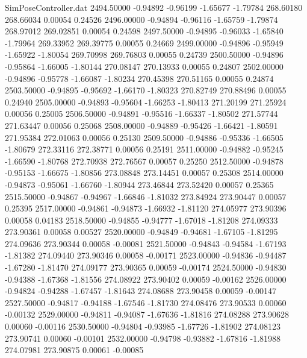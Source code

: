 \begin{filecontents}{SimPoseController.dat}
2494.50000   -0.94892   -0.96199    -1.65677   -1.79784  268.60180  268.66034    0.00054    0.24526
2496.00000   -0.94894   -0.96116    -1.65759   -1.79874  268.97012  269.02851    0.00054    0.24598
2497.50000   -0.94895   -0.96033    -1.65840   -1.79964  269.33952  269.39775    0.00055    0.24669
2499.00000   -0.94896   -0.95949    -1.65922   -1.80054  269.70998  269.76803    0.00055    0.24739
2500.50000   -0.94896   -0.95864    -1.66005   -1.80144  270.08147  270.13933    0.00055    0.24807
2502.00000   -0.94896   -0.95778    -1.66087   -1.80234  270.45398  270.51165    0.00055    0.24874
2503.50000   -0.94895   -0.95692    -1.66170   -1.80323  270.82749  270.88496    0.00055    0.24940
2505.00000   -0.94893   -0.95604    -1.66253   -1.80413  271.20199  271.25924    0.00056    0.25005
2506.50000   -0.94891   -0.95516    -1.66337   -1.80502  271.57744  271.63447    0.00056    0.25068
2508.00000   -0.94889   -0.95426    -1.66421   -1.80591  271.95384  272.01063    0.00056    0.25130
2509.50000   -0.94886   -0.95336    -1.66505   -1.80679  272.33116  272.38771    0.00056    0.25191
2511.00000   -0.94882   -0.95245    -1.66590   -1.80768  272.70938  272.76567    0.00057    0.25250
2512.50000   -0.94878   -0.95153    -1.66675   -1.80856  273.08848  273.14451    0.00057    0.25308
2514.00000   -0.94873   -0.95061    -1.66760   -1.80944  273.46844  273.52420    0.00057    0.25365
2515.50000   -0.94867   -0.94967    -1.66846   -1.81032  273.84924  273.90447    0.00057    0.25395
2517.00000   -0.94861   -0.94873    -1.66932   -1.81120  274.05977  273.90396    0.00058    0.04183
2518.50000   -0.94855   -0.94777    -1.67018   -1.81208  274.09333  273.90361    0.00058    0.00527
2520.00000   -0.94849   -0.94681    -1.67105   -1.81295  274.09636  273.90344    0.00058   -0.00081
2521.50000   -0.94843   -0.94584    -1.67193   -1.81382  274.09440  273.90346    0.00058   -0.00171
2523.00000   -0.94836   -0.94487    -1.67280   -1.81470  274.09177  273.90365    0.00059   -0.00174
2524.50000   -0.94830   -0.94388    -1.67368   -1.81556  274.08922  273.90402    0.00059   -0.00162
2526.00000   -0.94824   -0.94288    -1.67457   -1.81643  274.08688  273.90458    0.00059   -0.00147
2527.50000   -0.94817   -0.94188    -1.67546   -1.81730  274.08476  273.90533    0.00060   -0.00132
2529.00000   -0.94811   -0.94087    -1.67636   -1.81816  274.08288  273.90628    0.00060   -0.00116
2530.50000   -0.94804   -0.93985    -1.67726   -1.81902  274.08123  273.90741    0.00060   -0.00101
2532.00000   -0.94798   -0.93882    -1.67816   -1.81988  274.07981  273.90875    0.00061   -0.00085

\end{filecontents}
